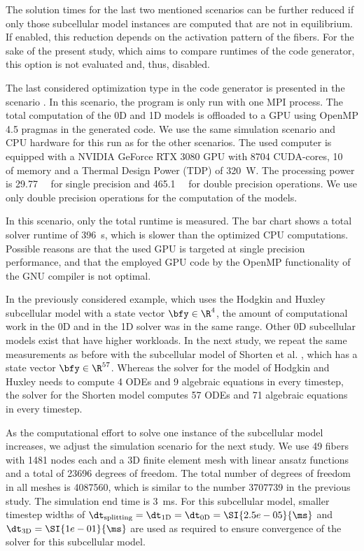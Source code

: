 The solution times for the last two mentioned scenarios can be further reduced if only those subcellular model instances are computed that are not in equilibrium. If enabled, this reduction depends on the activation pattern of the fibers. For the sake of the present study, which aims to compare runtimes of the code generator, this option is not evaluated and, thus, disabled.

The last considered optimization type in the code generator is presented in the scenario . In this scenario, the program is only run with one MPI process. The total computation of the 0D and 1D models is offloaded to a GPU using OpenMP 4.5 pragmas in the generated code. We use the same simulation scenario and CPU hardware for this run as for the other scenarios. The used computer is equipped with a NVIDIA GeForce RTX 3080 GPU with 8704 CUDA-cores, \SI{10}{\giga\byte} of memory and a Thermal Design Power (TDP) of \SI{320}{\watt}. The processing power is \SI{29.77}{\tera\flops} for single precision and \SI{465.1}{\giga\flops} for double precision operations. We use only double precision operations for the computation of the models.

In this scenario, only the total runtime is measured. The bar chart shows a total solver runtime of \SI{396}{\s}, which is slower than the optimized CPU computations. Possible reasons are that the used GPU is targeted at single precision performance, and that the employed GPU code by the OpenMP functionality of the GNU compiler is not optimal.

In the previously considered example, which uses the Hodgkin and Huxley subcellular model with a state vector $\bfy \in \R^4$, the amount of computational work in the 0D and in the 1D solver was in the same range. Other 0D subcellular models exist that have higher workloads. In the next study, we repeat the same measurements as before with the subcellular model of Shorten et al. \cite{Shorten2007}, which has a state vector $\bfy \in \R^{57}$.  Whereas the solver for the model of Hodgkin and Huxley needs to compute 4 ODEs and 9 algebraic equations in every timestep, the solver for the Shorten model computes 57 ODEs and 71 algebraic equations in every timestep.

As the computational effort to solve one instance of the subcellular model increases, we adjust the simulation scenario for the next study. 
We use 49 fibers with 1481 nodes each and a 3D finite element mesh with linear ansatz functions and a total of \num{23696} degrees of freedom. The total number of degrees of freedom in all meshes is \num{4087560}, which is similar to the number \num{3707739} in the previous study. The simulation end time is \SI{3}{\ms}. For this subcellular model, smaller timestep widths of $\dt_\text{splitting}=\dt_\text{1D}=\dt_\text{0D}=\SI{2.5e-05}{\ms}$ and $\dt_\text{3D}=\SI{1e-01}{\ms}$ are used as required to ensure convergence of the solver for this subcellular model.

